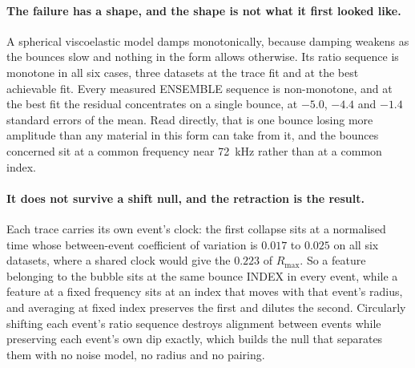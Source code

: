 \documentclass[10pt]{article}
\begin{document}
\paragraph{The failure has a shape, and the shape is not what it first looked like.} A
spherical viscoelastic model damps monotonically, because damping weakens as the bounces slow
and nothing in the form allows otherwise. Its ratio sequence is monotone in all six cases,
three datasets at the trace fit and at the best achievable fit. Every measured ENSEMBLE
sequence is non-monotone, and at the best fit the residual concentrates on a single bounce, at
$-5.0$, $-4.4$ and $-1.4$ standard errors of the mean. Read directly, that is one bounce losing
more amplitude than any material in this form can take from it, and the bounces concerned sit
at a common frequency near \SI{72}{\kilo\hertz} rather than at a common index.

\paragraph{It does not survive a shift null, and the retraction is the result.} Each trace
carries its own event's clock: the first collapse sits at a normalised time whose between-event
coefficient of variation is $0.017$ to $0.025$ on all six datasets, where a shared clock would
give the $0.223$ of $R_{\max}$. So a feature belonging to the bubble sits at the same bounce
INDEX in every event, while a feature at a fixed frequency sits at an index that moves with
that event's radius, and averaging at fixed index preserves the first and dilutes the second.
Circularly shifting each event's ratio sequence destroys alignment between events while
preserving each event's own dip exactly, which builds the null that separates them with no
noise model, no radius and no pairing.
\end{document}
